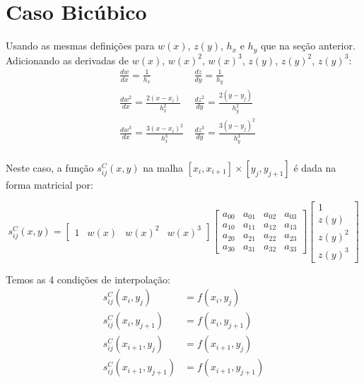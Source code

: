 \documentclass[a4paper, 12pt]{article}
\begin{document}
\section*{Caso Bicúbico}
Usando as mesmas definições para $w(x)$, $z(y)$, $h_x$ e $h_y$ que na seção
anterior. Adicionando as derivadas de $w{(x)}$, $w{(x)}^2$, $w{(x)}^3$, $z{(y)}$,
$z{(y)}^2$, $z{(y)}^3$:
\begin{align*}
    &\frac{dw}{dx} = \frac{1}{h_x} \ &\frac{dz}{dy} = \frac{1}{h_y}\\
    &\frac{dw^2}{dx} = \frac{2{(x - x_i)}}{h_{x}^{2}} \ &\frac{dz^2}{dy} = \frac{2{(y-y_j)}}{h_y^2}\\
    &\frac{dw^3}{dx} = \frac{3{(x - x_{i})}^{2}}{h_{x}^{3}} \ &\frac{dz^3}{dy} = \frac{3{(y-y_{j})}^{2}}{h_y^{3}}\\
\end{align*}

Neste caso, a função $s_{ij}^C(x,y)$ na malha $[x_i, x_{i+1}] \times [y_j,
y_{j+1}]$ é dada na forma matricial por:

\[
    s_{ij}^C(x,y) =
\begin{bmatrix}
    1 & w{(x)} & w{(x)}^2 & w{(x)}^3
\end{bmatrix}
\begin{bmatrix}
    a_{00} & a_{01} & a_{02} & a_{03}\\
    a_{10} & a_{11} & a_{12} & a_{13}\\
    a_{20} & a_{21} & a_{22} & a_{23}\\
    a_{30} & a_{31} & a_{32} & a_{33}
\end{bmatrix}
\begin{bmatrix}
    1 \\
    z{(y)} \\
    z{(y)}^2 \\
    z{(y)}^3
\end{bmatrix}
\]

Temos as 4 condições de interpolação:
\begin{align}
    s_{ij}^C(x_i,y_j)&=f(x_i, y_j)\tag{1} \\
    s_{ij}^C(x_i,y_{j + 1})&=f(x_i, y_{j + 1})\tag{2}\\
    s_{ij}^C(x_{i + 1},y_j)&=f(x_{i + 1}, y_j)\tag{3}\\
    s_{ij}^C(x_{i + 1},y_{j + 1})&=f(x_{i + 1}, y_{j + 1})\tag{4}
\end{align}
\end{document}
